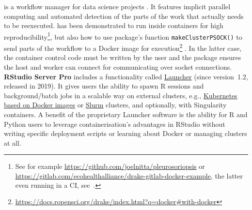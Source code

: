 \label{drake} \textbf{} is a workflow manager for data
science projects \citep{landau_drake_2019}. It features implicit
parallel computing and automated detection of the parts of the work that
actually needs to be reexecuted.  has been demonstrated
to run inside containers for high
reproducibility\footnote{See for example \href{https://github.com/joelnitta/pleurosoriopsis}{https://github.com/joelnitta/pleurosoriopsis} or \href{https://gitlab.com/ecohealthalliance/drake-gitlab-docker-example}{https://gitlab.com/ecohealthalliance/drake-gitlab-docker-example}, the latter even running in a CI, see~.},
but also how to use  package's function
\texttt{makeClusterPSOCK()} to send parts of the workflow to a Docker
image for
execution\footnote{\href{https://docs.ropensci.org/drake/index.html?q=docker\#with-docker}{https://docs.ropensci.org/drake/index.html?q=docker\#with-docker}}
\citep[see package's function documentation;~][]{future_2020}. In the
latter case, the container control code must be written by the user and
the  package ensures the host and worker can connect for
communicating over socket connections. \textbf{RStudio Server Pro}
includes a functionality called
\href{https://solutions.rstudio.com/launcher/overview/}{Launcher} (since
version~1.2, released in 2019). It gives users the ability to spawn R
sessions and background/batch jobs in a scalable way on external
clusters, e.g.,
\href{https://support.rstudio.com/hc/en-us/articles/360019253393-Using-Docker-images-with-RStudio-Server-Pro-Launcher-and-Kubernetes}{Kubernetes
based on Docker images} or \href{https://slurm.schedmd.com/}{Slurm}
clusters, and optionally, with Singularity containers. A benefit of the
proprietary Launcher software is the ability for R and Python users to
leverage containerisation's advantages in RStudio without writing
specific deployment scripts or learning about Docker or managing
clusters at all.

